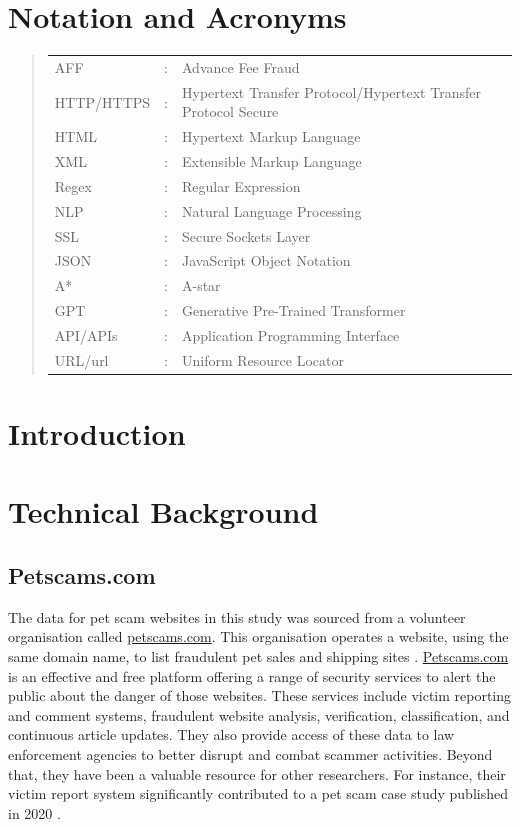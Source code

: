 \documentclass[ oneside,%
                    author={Cassie Qing Tang},
                    degree={BSc},
                     title={An Automated Response System for Disrupting Online Pet Scamming \\ },
                    subtitle={ }]{dissertation}
\begin{document}
\chapter*{Notation and Acronyms}
\begin{quote}
\noindent
\begin{tabular}{lcl}
AFF                 &:     & Advance Fee Fraud    
 \\ 
HTTP/HTTPS          &:     & Hypertext Transfer Protocol/Hypertext Transfer Protocol Secure
 \\ 
HTML                &:     & Hypertext Markup Language
\\
XML                 &:     & Extensible Markup Language
\\
Regex               &:     & Regular Expression
\\
NLP                 &:     & Natural Language Processing
\\
SSL                 &:     & Secure Sockets Layer
\\
JSON                &:     & JavaScript Object Notation
\\
A*                  &:     & A-star
\\
GPT                 &:     & Generative Pre-Trained Transformer
\\
API/APIs            &:     & Application Programming Interface
\\
URL/url             &:     & Uniform Resource Locator


\end{tabular}
\end{quote}


\mainmatter

\chapter{Introduction}
\label{chap:context}


\chapter{Technical Background}
\section{Petscams.com}
The data for pet scam websites in this study was sourced from a volunteer organisation called \url{petscams.com}. This organisation operates a website, using the same domain name, to list fraudulent pet sales and shipping sites \cite{brady_fighting_2024}. \url{Petscams.com} is an effective and free platform offering a range of security services to alert the public about the danger of those websites. These services include victim reporting and comment systems, fraudulent website analysis, verification, classification, and continuous article updates. They also provide access of these data to law enforcement agencies to better disrupt and combat scammer activities. Beyond that, they have been a valuable resource for other researchers. For instance, their victim report system significantly contributed to a pet scam case study published in 2020 \cite{whittaker_understanding_2020}.
\\
\end{document}
